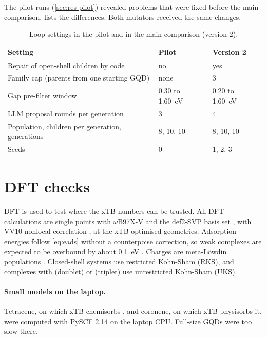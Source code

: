 The pilot runs (\cref{sec:res-pilot}) revealed problems that were fixed before the main
comparison.  lists the differences. Both mutators received the same
changes.

\begin{table}[ht]
  \centering
  \caption{Loop settings in the pilot and in the main comparison (version 2).}
  \label{tab:loop-versions}
  \small
  \begin{tabularx}{\textwidth}{@{}Lll@{}}
    \toprule
    Setting & Pilot & Version 2 \\
    \midrule
    Repair of open-shell children by code & no & yes \\
    Family cap (parents from one starting GQD) & none & 3 \\
    Gap pre-filter window & 0.30 to 1.60~eV & 0.20 to 1.60~eV \\
    LLM proposal rounds per generation & 3 & 4 \\
    Population, children per generation, generations & 8, 10, 10 & 8, 10, 10 \\
    Seeds & 0 & 1, 2, 3 \\
    \bottomrule
  \end{tabularx}
\end{table}

\section{DFT checks}
\label{sec:dft-methods}

DFT is used to test where the xTB numbers can be trusted. All DFT calculations are single points
with \(\omega\)B97X-V \cite{mardirossian2014wb97xv} and the def2-SVP basis set \cite{weigend2005def2},
with VV10 nonlocal correlation \cite{vydrov2010vv10}, at the xTB-optimised geometries. Adsorption
energies follow \cref{eq:eads} without a counterpoise correction, so weak complexes are expected to
be overbound by about 0.1~eV \cite{boys1970counterpoise}. Charges are meta-L\"owdin populations
\cite{sun2014metalowdin}. Closed-shell systems use restricted Kohn-Sham (RKS), and complexes
with  (doublet) or  (triplet) use unrestricted Kohn-Sham (UKS).

\paragraph{Small models on the laptop.} Tetracene, on which xTB chemisorbs , and coronene,
on which xTB physisorbs it, were computed with PySCF 2.14 on the laptop CPU. Full-size GQDs were too
slow there.

